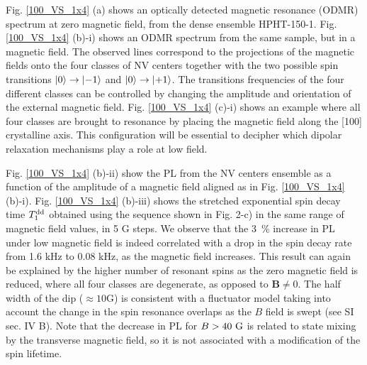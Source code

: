 \documentclass[preprintnumbers,amsmath,amssymb,superscriptaddress,twocolumn,showpacs]{revtex4-2}
\begin{document}

Fig. \ref{100_VS_1x4} (a) shows an optically detected magnetic resonance (ODMR) spectrum at zero magnetic field, from the dense ensemble HPHT-150-1.
Fig. \ref{100_VS_1x4} (b)-i) shows an ODMR spectrum from the same sample, but in a magnetic field. The observed lines correspond to the projections of the magnetic fields onto the four classes of NV centers together with the two possible spin transitions $\ket{0}\to\ket{-1}$ and $\ket{0}\to\ket{+1}$. The transitions frequencies of the four different classes can be controlled by changing the amplitude and orientation of the external magnetic field. Fig. \ref{100_VS_1x4} (c)-i) shows an example where all four classes are brought to resonance by placing the magnetic field along the [100] crystalline axis. 
This configuration will be essential to decipher which dipolar relaxation mechanisms play a role at low field. 

Fig. \ref{100_VS_1x4} (b)-ii) show the PL from the NV centers ensemble as a function of the amplitude of a magnetic field aligned as in Fig. \ref{100_VS_1x4} (b)-i). 
Fig. \ref{100_VS_1x4} (b)-iii) shows the stretched exponential spin decay time $T_1^{\rm dd}$ obtained using the sequence shown in Fig. 2-c) in the same range of magnetic field values, in 5 G steps. 
We observe that the 3~\% increase in PL under low magnetic field is indeed correlated with a drop in the spin decay rate from 1.6 kHz to 0.08 kHz, as the magnetic field increases. This result can again be explained by the higher number of resonant spins as the zero magnetic field is reduced, where all four classes are degenerate, as opposed to $\bm B \neq 0$. The half width of the dip ($\approx 10$G) is consistent with a fluctuator model taking into account the change in the spin resonance overlaps as the $B$ field is swept (see SI sec. IV B).
Note that the decrease in PL for $B>40\ \rm G$ is related to state mixing by the transverse magnetic field, so it is not associated with a modification of the spin lifetime. 
\end{document}
